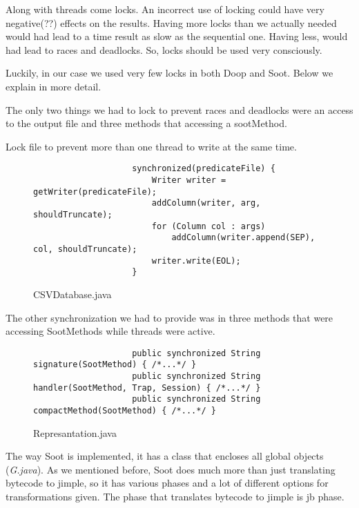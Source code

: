 \documentclass{dithesis}
\begin{document}
	Along with threads come locks. An incorrect use of locking could have very negative(??) effects on the results. Having more locks than we actually needed would had lead to a time result as slow as the sequential one. Having less, would had lead to races and deadlocks. So, locks should be used very consciously.

	Luckily, in our case we used very few locks in both Doop and Soot. Below we explain in more detail.
    
    	The only two things we had to lock to prevent races and deadlocks were an access to the output file and three methods that accessing a sootMethod.
    	
	    	Lock file to prevent more than one thread to write at the same time. 
	    	\begin{figure}[H]
	            \begin{lstlisting}
			    	synchronized(predicateFile) {
		                Writer writer = getWriter(predicateFile);
		                addColumn(writer, arg, shouldTruncate);
		                for (Column col : args)
		                    addColumn(writer.append(SEP), col, shouldTruncate);
		                writer.write(EOL);
	            	}
				\end{lstlisting}
	        \caption{CSVDatabase.java}
	        \end{figure}

	    	The other synchronization we had to provide was in three methods that were accessing SootMethods while threads were active.
	    	\begin{figure}[H]
	            \begin{lstlisting}
			    	public synchronized String signature(SootMethod) { /*...*/ }
			    	public synchronized String handler(SootMethod, Trap, Session) { /*...*/ }
			    	public synchronized String compactMethod(SootMethod) { /*...*/ }
				\end{lstlisting}
	        \caption{Represantation.java}
	        \end{figure}


	    The way Soot is implemented, it has a class that encloses all global objects (\textit{G.java}). As we mentioned before, Soot does much more than just translating bytecode to jimple, so it has various phases and a lot of different options for transformations given. The phase that translates bytecode to jimple is jb phase.
\end{document}
